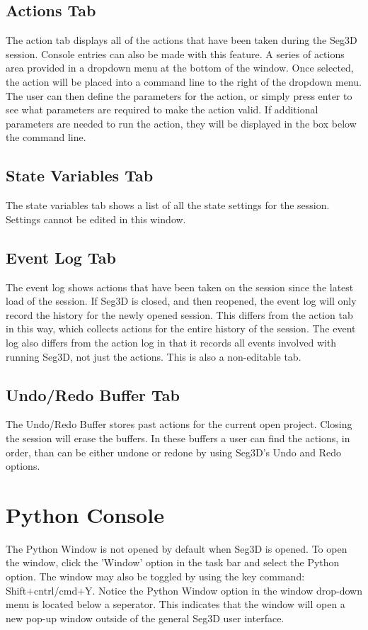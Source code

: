 \documentclass[fleqn,11pt,openany]{book}
\begin{document}
\subsection{Actions Tab}
The action tab displays all of the actions that have been taken during the Seg3D session.
Console entries can also be made with this feature.
A series of actions area provided in a dropdown menu at the bottom of the window.
Once selected, the action will be placed into a command line to the right of the dropdown menu.
The user can then define the parameters for the action, or simply press enter to see what parameters are required to make the action valid.
If additional parameters are needed to run the action, they will be displayed in the box below the command line.

\subsection{State Variables Tab}
The state variables tab  shows a list of all the state settings for the session.
Settings cannot be edited in this window.

\subsection{Event Log Tab}
The event log shows actions that have been taken on the session since the latest load of the session.
If Seg3D is closed, and then reopened, the event log will only record the history for the newly opened session.
This differs from the action tab in this way, which collects actions for the entire history of the session.
The event log also differs from the action log in that it records all events involved with running Seg3D, not just the actions.
This is also a non-editable tab.

\subsection{Undo/Redo Buffer Tab}
The Undo/Redo Buffer stores past actions for the current open project.
Closing the session will erase the buffers.
In these buffers a user can find the actions, in order, than can be either undone or redone by using Seg3D's Undo and Redo options.


\section{Python Console}
The Python Window is not opened by default when Seg3D is opened.  To open the window, click the 'Window' option in the task bar and select the Python option.  The window may also be toggled by using the key command: Shift+cntrl/cmd+Y.
Notice the Python Window option in the window drop-down menu is located below a seperator.  
This indicates that the window will open a new pop-up window outside of the general Seg3D user interface.
\end{document}
